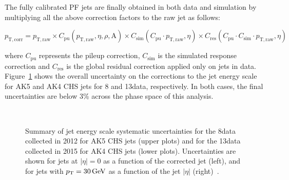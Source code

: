 The fully calibrated PF jets are finally obtained in both data and simulation by multiplying all the above correction factors to the raw jet \pt as follows:

\begin{equation}
p_\mathrm{T,corr} = p_\mathrm{T,raw} \times C_\mathrm{pu}(p_\mathrm{T,raw},\eta,\rho,\mathrm{A}) \times C_\mathrm{sim}(C_\mathrm{pu} \cdot p_\mathrm{T,raw},\eta) \times C_\mathrm{res}(C_\mathrm{pu} \cdot C_\mathrm{sim} \cdot p_\mathrm{T,raw},\eta)
\end{equation}

where $C_\mathrm{pu}$ represents the pileup correction, $C_\mathrm{sim}$ is the simulated response correction and $C_\mathrm{res}$ is the global residual correction applied only on jets in data.
Figure~\ref{fig:jesunc813TeV} shows the overall uncertainty on the corrections to the jet energy scale for AK5 and AK4 CHS jets for 8 and 13\TeV data, respectively. In both cases, the final uncertainties are below 3\% across the phase space of this analysis.

\begin{figure}[!htb]
\centering
{}
\\
\caption{Summary of jet energy scale systematic uncertainties for the 8\TeV data collected in 2012 for AK5 CHS jets (upper plots) and for the 13\TeV data collected in 2015 for AK4 CHS jets (lower plots). Uncertainties are shown for jets at $|\eta| = 0$ as a function of the corrected jet \pt (left), and for jets with $p_{\mathrm{T}} = 30\,\text{Ge\hspace{-.08em}V}$ as a function of the jet $|\eta|$ (right)~\cite{Khachatryan:2016kdb,CMS-DP-2016-020}.}
\label{fig:jesunc813TeV}
\end{figure}

